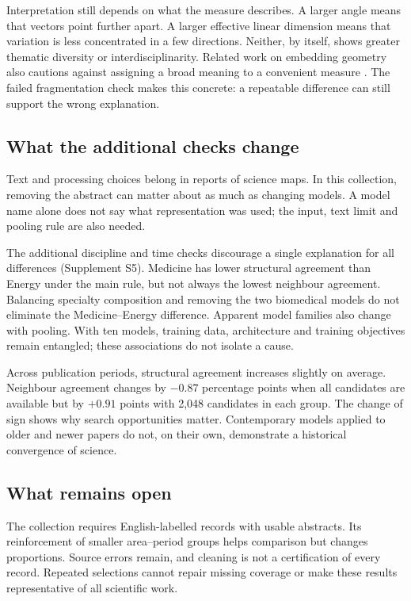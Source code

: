\documentclass[12pt]{article}
\begin{document}
Interpretation still depends on what the measure describes. A larger angle means that vectors point further apart. A larger effective linear dimension means that variation is less concentrated in a few directions. Neither, by itself, shows greater thematic diversity or interdisciplinarity. Related work on embedding geometry also cautions against assigning a broad meaning to a convenient measure \citep{rudman-etal-2022-isoscore}. The failed fragmentation check makes this concrete: a repeatable difference can still support the wrong explanation.

\subsection{What the additional checks change}
Text and processing choices belong in reports of science maps. In this collection, removing the abstract can matter about as much as changing models. A model name alone does not say what representation was used; the input, text limit and pooling rule are also needed.

The additional discipline and time checks discourage a single explanation for all differences (Supplement S5). Medicine has lower structural agreement than Energy under the main rule, but not always the lowest neighbour agreement. Balancing specialty composition and removing the two biomedical models do not eliminate the Medicine--Energy difference. Apparent model families also change with pooling. With ten models, training data, architecture and training objectives remain entangled; these associations do not isolate a cause.

Across publication periods, structural agreement increases slightly on average. Neighbour agreement changes by $-0.87$ percentage points when all candidates are available but by $+0.91$ points with 2,048 candidates in each group. The change of sign shows why search opportunities matter. Contemporary models applied to older and newer papers do not, on their own, demonstrate a historical convergence of science.

\subsection{What remains open}
The collection requires English-labelled records with usable abstracts. Its reinforcement of smaller area--period groups helps comparison but changes proportions. Source errors remain, and cleaning is not a certification of every record. Repeated selections cannot repair missing coverage or make these results representative of all scientific work.
\end{document}
